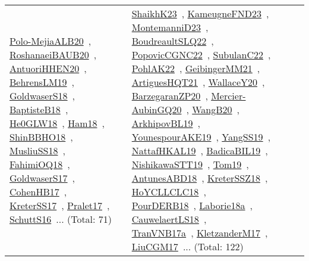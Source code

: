 {\begin{longtable}{lp{3cm}>{\raggedright\arraybackslash}p{6cm}>{\raggedright\arraybackslash}p{6cm}>{\raggedright\arraybackslash}p{8cm}}
\href{../works/Polo-MejiaALB20.pdf}{Polo-MejiaALB20}~\cite{Polo-MejiaALB20}, \href{../works/RoshanaeiBAUB20.pdf}{RoshanaeiBAUB20}~\cite{RoshanaeiBAUB20}, \href{../works/AntuoriHHEN20.pdf}{AntuoriHHEN20}~\cite{AntuoriHHEN20}, \href{../works/BehrensLM19.pdf}{BehrensLM19}~\cite{BehrensLM19}, \href{../works/GoldwaserS18.pdf}{GoldwaserS18}~\cite{GoldwaserS18}, \href{../works/BaptisteB18.pdf}{BaptisteB18}~\cite{BaptisteB18}, \href{../works/He0GLW18.pdf}{He0GLW18}~\cite{He0GLW18}, \href{../works/Ham18.pdf}{Ham18}~\cite{Ham18}, \href{../works/ShinBBHO18.pdf}{ShinBBHO18}~\cite{ShinBBHO18}, \href{../works/MusliuSS18.pdf}{MusliuSS18}~\cite{MusliuSS18}, \href{../works/FahimiOQ18.pdf}{FahimiOQ18}~\cite{FahimiOQ18}, \href{../works/GoldwaserS17.pdf}{GoldwaserS17}~\cite{GoldwaserS17}, \href{../works/CohenHB17.pdf}{CohenHB17}~\cite{CohenHB17}, \href{../works/KreterSS17.pdf}{KreterSS17}~\cite{KreterSS17}, \href{../works/Pralet17.pdf}{Pralet17}~\cite{Pralet17}, \href{../works/SchuttS16.pdf}{SchuttS16}~\cite{SchuttS16}... (Total: 71) & \href{../works/ShaikhK23.pdf}{ShaikhK23}~\cite{ShaikhK23}, \href{../works/KameugneFND23.pdf}{KameugneFND23}~\cite{KameugneFND23}, \href{../works/MontemanniD23.pdf}{MontemanniD23}~\cite{MontemanniD23}, \href{../works/BoudreaultSLQ22.pdf}{BoudreaultSLQ22}~\cite{BoudreaultSLQ22}, \href{../works/PopovicCGNC22.pdf}{PopovicCGNC22}~\cite{PopovicCGNC22}, \href{../works/SubulanC22.pdf}{SubulanC22}~\cite{SubulanC22}, \href{../works/PohlAK22.pdf}{PohlAK22}~\cite{PohlAK22}, \href{../works/GeibingerMM21.pdf}{GeibingerMM21}~\cite{GeibingerMM21}, \href{../works/ArtiguesHQT21.pdf}{ArtiguesHQT21}~\cite{ArtiguesHQT21}, \href{../works/WallaceY20.pdf}{WallaceY20}~\cite{WallaceY20}, \href{../works/BarzegaranZP20.pdf}{BarzegaranZP20}~\cite{BarzegaranZP20}, \href{../works/Mercier-AubinGQ20.pdf}{Mercier-AubinGQ20}~\cite{Mercier-AubinGQ20}, \href{../works/WangB20.pdf}{WangB20}~\cite{WangB20}, \href{../works/ArkhipovBL19.pdf}{ArkhipovBL19}~\cite{ArkhipovBL19}, \href{../works/YounespourAKE19.pdf}{YounespourAKE19}~\cite{YounespourAKE19}, \href{../works/YangSS19.pdf}{YangSS19}~\cite{YangSS19}, \href{../works/NattafHKAL19.pdf}{NattafHKAL19}~\cite{NattafHKAL19}, \href{../works/BadicaBIL19.pdf}{BadicaBIL19}~\cite{BadicaBIL19}, \href{../works/NishikawaSTT19.pdf}{NishikawaSTT19}~\cite{NishikawaSTT19}, \href{../works/Tom19.pdf}{Tom19}~\cite{Tom19}, \href{../works/AntunesABD18.pdf}{AntunesABD18}~\cite{AntunesABD18}, \href{../works/KreterSSZ18.pdf}{KreterSSZ18}~\cite{KreterSSZ18}, \href{../works/HoYCLLCLC18.pdf}{HoYCLLCLC18}~\cite{HoYCLLCLC18}, \href{../works/PourDERB18.pdf}{PourDERB18}~\cite{PourDERB18}, \href{../works/Laborie18a.pdf}{Laborie18a}~\cite{Laborie18a}, \href{../works/CauwelaertLS18.pdf}{CauwelaertLS18}~\cite{CauwelaertLS18}, \href{../works/TranVNB17a.pdf}{TranVNB17a}~\cite{TranVNB17a}, \href{../works/KletzanderM17.pdf}{KletzanderM17}~\cite{KletzanderM17}, \href{../works/LiuCGM17.pdf}{LiuCGM17}~\cite{LiuCGM17}... (Total: 122)\\

\end{longtable}}
